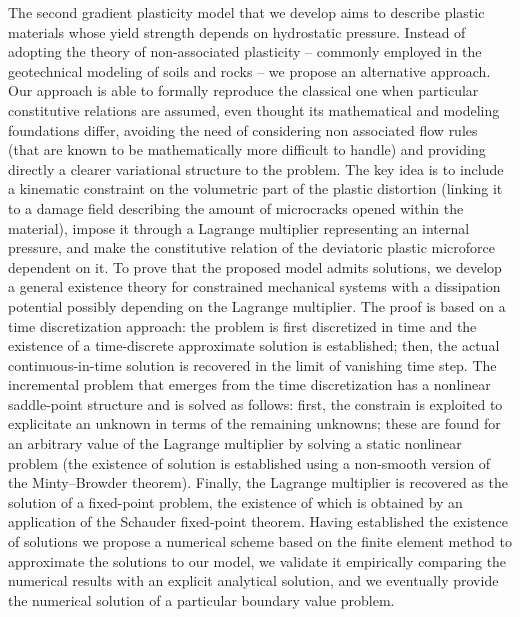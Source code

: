 \documentclass[a4paper,10pt,twoside]{amsbook}
\numberwithin{section}{chapter}
\numberwithin{equation}{chapter}
\theoremstyle{definition}
\begin{document}
The second gradient plasticity model that we develop aims to describe plastic materials whose yield strength depends on hydrostatic pressure. Instead of adopting the theory of non-associated plasticity -- commonly employed in the geotechnical modeling of soils and rocks -- we propose an alternative approach. Our approach is able to formally reproduce the classical one when particular constitutive relations are assumed, even thought its mathematical and modeling foundations differ, avoiding the need of considering non associated flow rules (that are known to be mathematically more difficult to handle) and providing directly a clearer variational structure to the problem. The key idea is to include a kinematic constraint on the volumetric part of the plastic distortion (linking it to a damage field describing the amount of microcracks opened within the material), impose it through a Lagrange multiplier representing an internal pressure, and make the constitutive relation of the deviatoric plastic microforce dependent on it. To prove that the proposed model admits solutions, we develop a general existence theory for constrained mechanical systems with a dissipation potential possibly depending on the Lagrange multiplier. The proof is based on a time discretization approach: the problem is first discretized in time and the existence of a time-discrete approximate solution is established; then, the actual continuous-in-time solution is recovered in the limit of vanishing time step. The incremental problem that emerges from the time discretization has a nonlinear saddle-point structure and is solved as follows: first, the constrain is exploited to explicitate an unknown in terms of the remaining unknowns; these are found for an arbitrary value of the Lagrange multiplier by solving a static nonlinear problem (the existence of solution is established using a non-smooth version of the Minty--Browder theorem). Finally, the Lagrange multiplier is recovered as the solution of a fixed-point problem, the existence of which is obtained by an application of the Schauder fixed-point theorem. Having established the existence of solutions we propose a numerical scheme based on the finite element method to approximate the solutions to our model, we validate it empirically comparing the numerical results with an explicit analytical solution, and we eventually provide the numerical solution of a particular boundary value problem.

\vspace*{\fill}

\cleardoublepage
\end{document}
